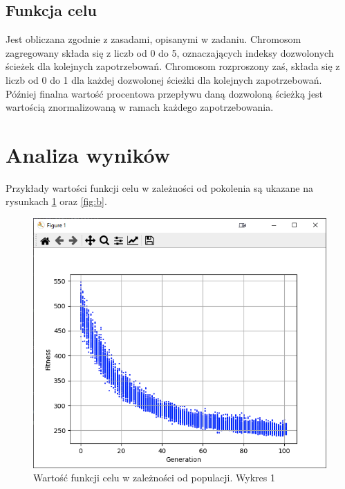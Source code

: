 \subsection{Funkcja celu}

Jest obliczana zgodnie z zasadami, opisanymi w zadaniu. Chromosom zagregowany składa się z liczb od 0 do 5, oznaczających indeksy dozwolonych ścieżek dla kolejnych zapotrzebowań. Chromosom rozproszony zaś, składa się z liczb od 0 do 1 dla każdej dozwolonej ścieżki dla kolejnych zapotrzebowań. Później finalna wartość procentowa przepływu daną dozwoloną ścieżką jest wartością znormalizowaną w ramach każdego zapotrzebowania.

\section{Analiza wyników}

Przykłady wartości funkcji celu w zależności od pokolenia są ukazane na rysunkach \ref{fig:a} oraz \ref{fig:b}.

\begin{figure}[h!]
    \centering
    \includegraphics[width=\textwidth]{img/wykres.png}
    \caption{Wartość funkcji celu w zależności od populacji. Wykres 1}
    \label{fig:a}
\end{figure}

